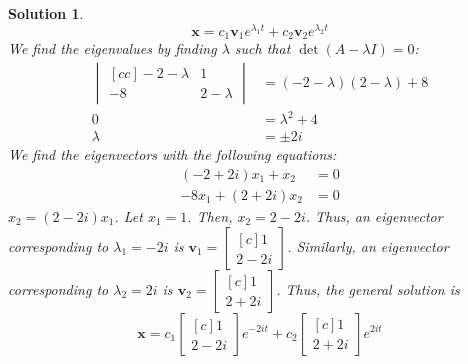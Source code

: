 \documentclass[11pt]{scrartcl}
\theoremstyle{dotlessP}
\newtheorem{sol}{Solution}[section]
\theoremstyle{dotlessN}
\begin{document}
\begin{sol}
	\[
	\bm{x} = c_1\bm{v}_1e^{\lambda_1 t} + c_2\bm{v}_2e^{\lambda_2 t}
	\] 
	We find the eigenvalues by finding $\lambda$ such that $\det(A - \lambda I) = 0$:
	\begin{align*}
		\begin{vmatrix}[cc]
			-2-\lambda & 1 \\
			-8 & 2-\lambda
		\end{vmatrix}  &= 
		(-2-\lambda)(2-\lambda) + 8 \\
		0 &= \lambda^2 + 4 \\
		\lambda &= \pm 2i
	\end{align*}
	We find the eigenvectors with the following equations:
	\begin{align*}
		(-2 + 2i)x_1 + x_2 &= 0 \\
		-8x_1 + (2 + 2i)x_2 &= 0
	\end{align*}
	$x_2 = (2 - 2i)x_1$. Let $x_1 = 1$. Then, $x_2 = 2-2i$. Thus, an eigenvector corresponding to $\lambda_1 = -2i$ is 
	$\bm{v}_1 = \begin{bmatrix}[c]
		1 \\
		2 - 2i
	\end{bmatrix}$. Similarly, an eigenvector corresponding to  $\lambda_2 = 2i$ is 
	$\bm{v}_2 = \begin{bmatrix}[c]
	1 \\
	2 + 2i
	\end{bmatrix}$. Thus, the general solution is
	\[
		\bm{x} = c_1 
		\begin{bmatrix}[c]
			1 \\
			2 - 2i
		\end{bmatrix}e^{-2it} + c_2
		\begin{bmatrix}[c]
			1 \\
			2 + 2i
		\end{bmatrix} e^{2it}
	\] 
\end{sol}
\end{document}
